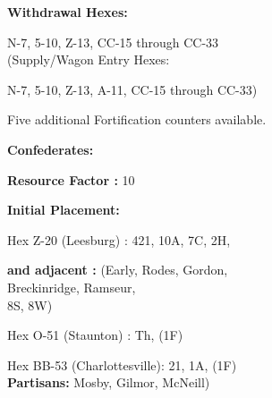 \begin{scenariodata}
\textbf{Withdrawal Hexes:}\\
\end{scenariodata}

\begin{scenariodata}
N-7, 5-10, Z-13, CC-15 through CC-33\\
(Supply/Wagon Entry Hexes:\\
\end{scenariodata}

\begin{scenariodata}
N-7, 5-10, Z-13, A-11, CC-15 through CC-33)\\
\end{scenariodata}

Five additional Fortification counters available.

\begin{scenariodata}
\textbf{Confederates:}\\
\end{scenariodata}

\begin{scenariodata}
\textbf{Resource Factor :} 10\\
\end{scenariodata}

\begin{scenariodata}
\textbf{Initial Placement:}\\
\end{scenariodata}

\begin{scenariodata}
Hex Z-20 (Leesburg) : 421, 10A, 7C, 2H,\\
\end{scenariodata}

\begin{scenariodata}
\textbf{and adjacent :} (Early, Rodes, Gordon,\\
Breckinridge, Ramseur,\\
8S, 8W)\\
\end{scenariodata}

\begin{scenariodata}
Hex O-51 (Staunton) : Th, (1F)\\
\end{scenariodata}

\begin{scenariodata}
Hex BB-53 (Charlottesville): 21, 1A, (1F)\\
\textbf{Partisans:} Mosby, Gilmor, McNeill)\\
\end{scenariodata}


